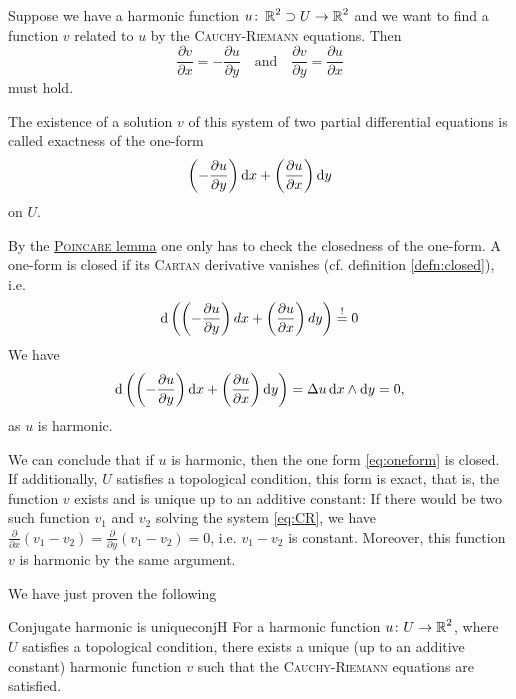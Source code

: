 \documentclass[a4paper,english]{article}
\begin{document}
Suppose we have a harmonic function $u \colon \operatorname{\mathbb{R}}^2 \supset U \to \operatorname{\mathbb{R}}^2$ and we want to find a function $v$ related to $u$ by the \textsc{Cauchy-Riemann} equations.
Then
\begin{equation} \label{eq:CR}
    \frac{\partial v}{\partial x}
    = - \frac{\partial u}{\partial y}
    \quad \text{and} \quad
    \frac{\partial v}{\partial y}
    = \frac{\partial u}{\partial x}
\end{equation}
must hold.

The existence of a solution $v$ of this system of two partial differential equations is called exactness of the one-form 
\begin{equation} \label{eq:oneform}
    \left(-\frac{\partial u}{\partial y}\right) \mathop{}\!\mathrm{d}{x}
    + \left( \frac{\partial u}{\partial x}\right) \mathop{}\!\mathrm{d}{y}
\end{equation}
on $U$.

By the \hyperref[th:Poincare]{\textsc{Poincare} lemma} one only has to check the closedness of the one-form.
A one-form is closed if its \textsc{Cartan} derivative vanishes (cf. definition \ref{defn:closed}), i.e.
\begin{equation*}
    \mathop{}\!\mathrm{d} \left(  \left(-\frac{\partial u}{\partial y}\right) dx
    + \left( \frac{\partial u}{\partial x}\right) dy\right)
    \overset{!}{=} 0
\end{equation*}
We have
\begin{equation*}
    \mathop{}\!\mathrm{d} \left(  \left(-\frac{\partial u}{\partial y}\right) \mathop{}\!\mathrm{d}{x}
    + \left( \frac{\partial u}{\partial x}\right) \mathop{}\!\mathrm{d}{y} \right)
    = \Delta u \mathop{}\!\mathrm{d} x \wedge \mathop{}\!\mathrm{d} y
    = 0,
\end{equation*}
as $u$ is harmonic.

We can conclude that if $u$ is harmonic, then the one form \eqref{eq:oneform} is closed.
If additionally, $U$ satisfies a topological condition, this form is exact, that is, the function $v$ exists and is unique up to an additive constant:
If there would be two such function $v_1$ and $v_2$ solving the system \eqref{eq:CR}, we have $\frac{\partial}{\partial x} (v_1 - v_2) = \frac{\partial}{\partial y} (v_1 - v_2) = 0$, i.e. $v_1 - v_2$ is constant.
Moreover, this function $v$ is harmonic by the same argument.

We have just proven the following
\begin{thm}{Conjugate harmonic is unique}{conjH}
    For a harmonic function $u \colon U \to \operatorname{\mathbb{R}}^2$, where $U$ satisfies a topological condition, there exists a unique (up to an additive constant) harmonic function $v$ such that the \textsc{Cauchy-Riemann} equations are satisfied.
\end{thm}
\end{document}
